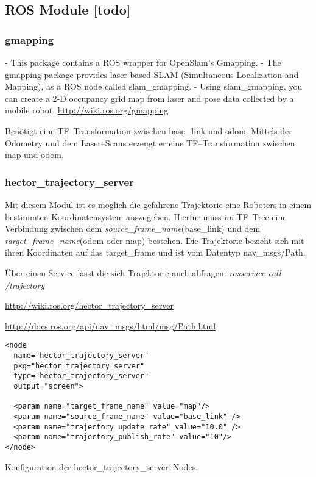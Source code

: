 \subsection{ROS Module [todo]}


\begin{comment}
------------------------------------------------------------------------------------------
\end{comment}
\subsubsection{gmapping}

- This package contains a ROS wrapper for OpenSlam's Gmapping.
- The gmapping package provides laser-based SLAM (Simultaneous Localization and Mapping), as a ROS node called slam\_gmapping.
- Using slam\_gmapping, you can create a 2-D occupancy grid map from laser and pose data collected by a mobile robot.
\url{http://wiki.ros.org/gmapping}

Benötigt eine TF--Transformation zwischen base\_link und odom. Mittels der Odometry und dem Laser--Scans erzeugt er eine TF--Transformation zwischen map und odom.


\begin{comment}
------------------------------------------------------------------------------------------
\end{comment}
\subsubsection{hector\_trajectory\_server}

Mit diesem Modul ist es möglich die gefahrene Trajektorie eine Roboters in einem bestimmten Koordinatensystem auszugeben. Hierfür muss im TF--Tree eine Verbindung zwischen dem \textit{source\_frame\_name}(base\_link) und dem \textit{target\_frame\_name}(odom oder map) bestehen. Die Trajektorie bezieht sich mit ihren Koordinaten auf das target\_frame und ist vom Datentyp nav\_msgs/Path.

Über einen Service lässt die sich Trajektorie auch abfragen: \textit{rosservice call /trajectory}

\url{http://wiki.ros.org/hector_trajectory_server}

\url{http://docs.ros.org/api/nav_msgs/html/msg/Path.html}

\begin{listing}
	\begin{verbatim}
<node 
  name="hector_trajectory_server"
  pkg="hector_trajectory_server"
  type="hector_trajectory_server"
  output="screen">

  <param name="target_frame_name" value="map"/>
  <param name="source_frame_name" value="base_link" />
  <param name="trajectory_update_rate" value="10.0" />
  <param name="trajectory_publish_rate" value="10"/>
</node>
	\end{verbatim}
	\unskip
	\caption{Konfiguration der hector\_trajectory\_server--Nodes.}
	\label{lst:hector_trajectory_server_node}
\end{listing}


